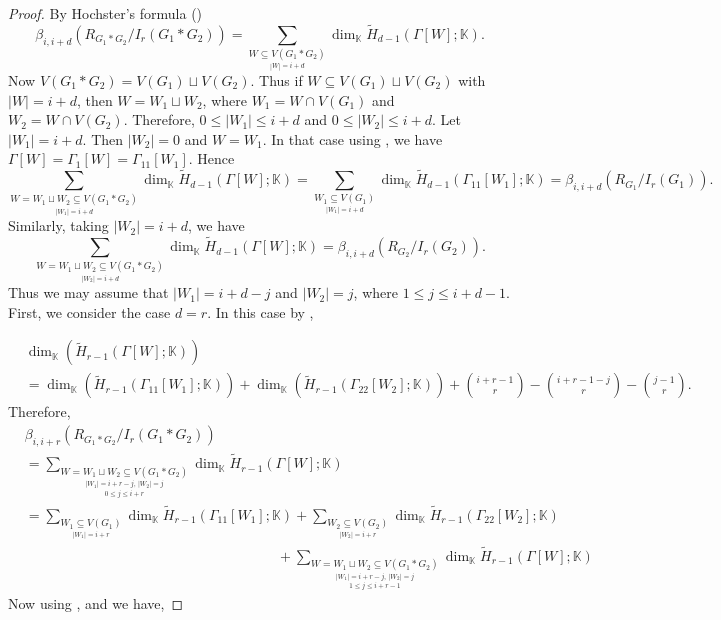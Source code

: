 \documentclass[12pt,reqno]{amsart}
\theoremstyle{definition}
\newcommand{\K}{\mathbb K}
\begin{document}
\begin{proof}
    By Hochster's formula ()
    {\footnotesize
    \[
\beta_{i,i+d}(R_{G_1*G_2}/I_r(G_1*G_2))= \sum_{\underset{|W|=i+d}{W \subseteq V(G_1*G_2) }} \dim_{\mathbb{K}} \widetilde{H}_{d-1}(\Gamma[W]; \mathbb{K}).
\]
}
\noindent
 Now $V(G_1*G_2)=V(G_1)\sqcup V(G_2)$. Thus if $W\subseteq V(G_1)\sqcup V(G_2)$ with $|W|=i+d$, then $W=W_1\sqcup W_2$, where $W_1=W\cap V(G_1)$ and $W_2=W\cap V(G_2)$. Therefore, $0\le |W_1|\le i+d$ and $0\le |W_2|\le i+d$. Let $|W_1|=i+d$. Then $|W_2|=0$ and $W=W_1$. In that case using , we have $\Gamma[W]=\Gamma_1[W]=\Gamma_{11}[W_1]$. Hence
 {\footnotesize
 \begin{equation}\label{eqnew1}
 \sum_{\underset{|W_1|=i+d}{W=W_1\sqcup W_2 \subseteq V(G_1*G_2) }} \dim_{\mathbb{K}} \widetilde{H}_{d-1}(\Gamma[W]; \mathbb{K})=\sum_{\underset{|W_1|=i+d}{W_1 \subseteq V(G_1) }} \dim_{\mathbb{K}} \widetilde{H}_{d-1}(\Gamma_{11}[W_1]; \mathbb{K})=\beta_{i,i+d}(R_{G_1}/I_r(G_1)).
  \end{equation}}
 \noindent
 Similarly, taking $|W_2|=i+d$, we have 
 {\footnotesize
 \begin{equation}\label{eqnew2}
  \sum_{\underset{|W_2|=i+d}{W=W_1\sqcup W_2 \subseteq V(G_1*G_2) }} \dim_{\mathbb{K}} \widetilde{H}_{d-1}(\Gamma[W]; \mathbb{K})=\beta_{i,i+d}(R_{G_2}/I_r(G_2)).
 \end{equation}}
 \noindent
Thus we may assume that $|W_1|=i+d-j$ and $|W_2|=j$, where $1\le j\le i+d-1$. First, we consider the case $d=r$. In this case by ,

{\footnotesize
    \begin{equation}\label{eqnew3}
    \begin{split}
     &\dim_{\K}(\widetilde H_{r-1}(\Gamma[W];\K))\\
     &=\dim_{\K}(\widetilde H_{r-1}(\Gamma_{11}[W_1];\K))+\dim_{\K}(\widetilde H_{r-1}(\Gamma_{22}[W_2];\K))+{i+r-1\choose r}-{i+r-1-j\choose r}-{j-1\choose r}.   
    \end{split}
    \end{equation}
    }
    Therefore,
    {\footnotesize
    \begin{align*}
       &\beta_{i,i+r}(R_{G_1*G_2}/I_r(G_1*G_2))\\
       &=\sum_{\underset{0\le j\le i+r}{\underset{|W_1|=i+r-j,\,|W_2|=j}{W=W_1\sqcup W_2 \subseteq V(G_1*G_2) }}} \dim_{\mathbb{K}} \widetilde{H}_{r-1}(\Gamma[W]; \mathbb{K})\\
       &=\sum_{\underset{|W_1|=i+r}{W_1 \subseteq V(G_1) }} \dim_{\mathbb{K}} \widetilde{H}_{r-1}(\Gamma_{11}[W_1]; \mathbb{K})+\sum_{\underset{|W_2|=i+r}{W_2 \subseteq V(G_2) }} \dim_{\mathbb{K}} \widetilde{H}_{r-1}(\Gamma_{22}[W_2]; \mathbb{K})\\
       &\hspace{18em}+\sum_{\underset{1\le j\le i+r-1}{\underset{|W_1|=i+r-j,\,|W_2|=j}{W=W_1\sqcup W_2 \subseteq V(G_1*G_2) }}} \dim_{\mathbb{K}} \widetilde{H}_{r-1}(\Gamma[W]; \mathbb{K})
       \end{align*}}
Now using ,  and  we have,


\end{proof}
\end{document}
